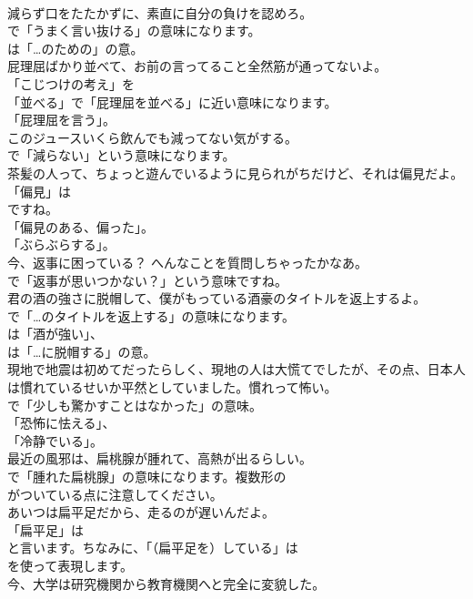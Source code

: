 \documentclass[8pt]{extreport}
\begin{document}
\begin{CJK}{UTF8}{min}
\\	減らず口をたたかずに、素直に自分の負けを認めろ。 
\\	で「うまく言い抜ける」の意味になります。
\\	は「…のための」の意。	
\\	屁理屈ばかり並べて、お前の言ってること全然筋が通ってないよ。 
\\	「こじつけの考え」を
\\	「並べる」で「屁理屈を並べる」に近い意味になります。
\\	「屁理屈を言う」。	
\\	このジュースいくら飲んでも減ってない気がする。 
\\	で「減らない」という意味になります。	
\\	茶髪の人って、ちょっと遊んでいるように見られがちだけど、それは偏見だよ。 
\\	「偏見」は
\\	ですね。
\\	「偏見のある、偏った」。
\\	「ぶらぶらする」。	
\\	今、返事に困っている？ へんなことを質問しちゃったかなあ。 
\\	で「返事が思いつかない？」という意味ですね。	
\\	君の酒の強さに脱帽して、僕がもっている酒豪のタイトルを返上するよ。 
\\	で「…のタイトルを返上する」の意味になります。
\\	は「酒が強い」、
\\	は「…に脱帽する」の意。	
\\	現地で地震は初めてだったらしく、現地の人は大慌てでしたが、その点、日本人は慣れているせいか平然としていました。慣れって怖い。 
\\	で「少しも驚かすことはなかった」の意味。
\\	「恐怖に怯える」、
\\	「冷静でいる」。	
\\	最近の風邪は、扁桃腺が腫れて、高熱が出るらしい。 
\\	で「腫れた扁桃腺」の意味になります。複数形の
\\	がついている点に注意してください。	
\\	あいつは扁平足だから、走るのが遅いんだよ。 
\\	「扁平足」は
\\	と言います。ちなみに、「（扁平足を）している」は
\\	を使って表現します。	
\\	今、大学は研究機関から教育機関へと完全に変貌した。 

\end{CJK}
\end{document}
